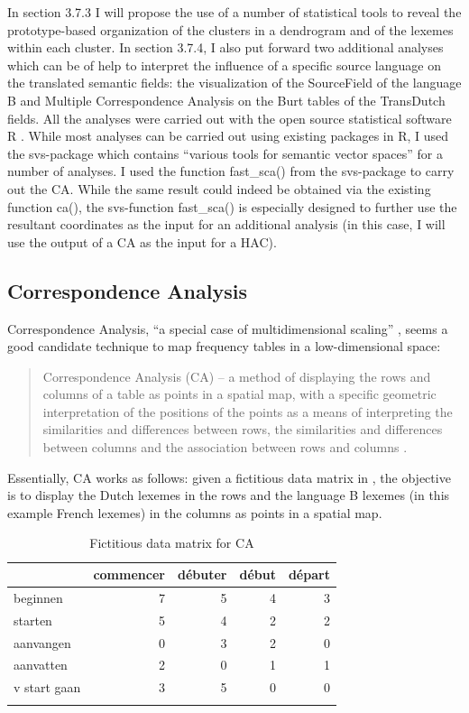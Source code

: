 In section 3.7.3 I will propose the use of a number of statistical tools to reveal the prototype-based organization of the clusters in a dendrogram and of the lexemes within each cluster. In section 3.7.4, I also put forward two additional analyses which can be of help to interpret the influence of a specific source language on the translated semantic fields: the visualization of the SourceField of the language B and Multiple Correspondence Analysis on the Burt tables of the TransDutch fields. All the analyses were carried out with the open source statistical software R \citep{r_core_r:_2014}. While most analyses can be carried out using existing packages in R, I used the svs{}-package \citep{plevoets_svs:_2015} which contains “various tools for semantic vector spaces” for a number of analyses. I used the function fast\_sca() from the svs{}-package to carry out the CA. While the same result could indeed be obtained via the existing function ca(), the svs{}-function fast\_sca() is especially designed to further use the resultant coordinates as the input for an additional analysis (in this case, I will use the output of a CA as the input for a HAC).


\subsection{Correspondence Analysis}
\label{sec:3.7.1}  
Correspondence Analysis, “a special case of multidimensional scaling” \citep[136]{baayen_analyzing_2008}, seems a good candidate technique to map frequency tables in a low-dimensional space:

\begin{quote}
Correspondence Analysis (CA) – a method of displaying the rows and columns of a table as points in a spatial map, with a specific geometric interpretation of the positions of the points as a means of interpreting the similarities and differences between rows, the similarities and differences between columns and the association between rows and columns \citep[264]{greenacre_correspondence_2007}.
\end{quote}

Essentially, CA works as follows: given a fictitious data matrix in , the objective is to display the Dutch lexemes in the rows and the language B lexemes (in this example French lexemes) in the columns as points in a spatial map.

\begin{table}\caption{Fictitious data matrix for CA\label{tab:3:12}}
\begin{tabular}{lrrrr}
\lsptoprule
& commencer & d\'{e}buter & d\'ebut & d\'epart\\\midrule
beginnen     & 7 & 5 & 4 & 3\\
starten      & 5 & 4 & 2 & 2\\
aanvangen    & 0 & 3 & 2 & 0\\
aanvatten    & 2 & 0 & 1 & 1\\
v start gaan & 3 & 5 & 0 & 0\\
\lspbottomrule
\end{tabular}
\end{table}


